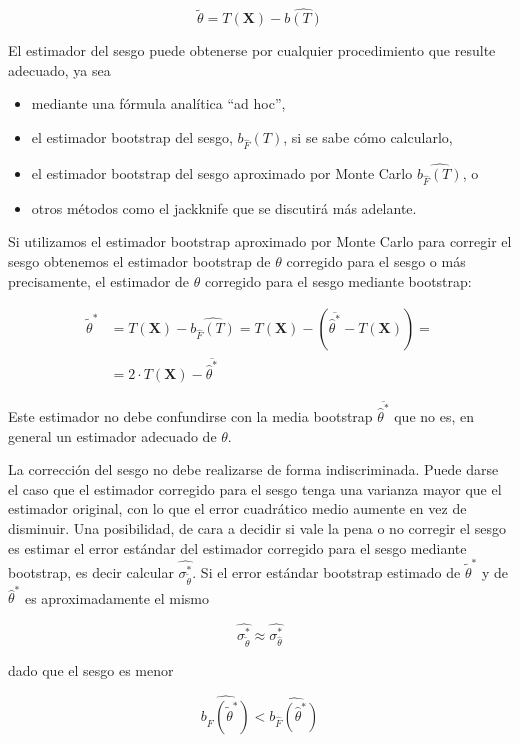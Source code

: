 \documentclass[
]{article}
\providecommand{\tightlist}{%
  \setlength{\itemsep}{0pt}\setlength{\parskip}{0pt}}
\begin{document}
\[
\tilde{\theta}=T(\mathbf{X})-\widehat{b(T)}
\]

El estimador del sesgo puede obtenerse por cualquier procedimiento que resulte adecuado, ya sea

\begin{itemize}
\tightlist
\item
  mediante una fórmula analítica ``ad hoc'',
\item
  el estimador bootstrap del sesgo, \(b_{\hat{F}}(T)\), si se sabe cómo calcularlo,
\item
  el estimador bootstrap del sesgo aproximado por Monte Carlo \(\widehat{b_{\hat{F}}(T)}\), o
\item
  otros métodos como el jackknife que se discutirá más adelante.
\end{itemize}

Si utilizamos el estimador bootstrap aproximado por Monte Carlo para corregir el sesgo obtenemos el estimador bootstrap de \(\theta\) corregido para el sesgo o más precisamente, el estimador de \(\theta\) corregido para el sesgo mediante bootstrap:

\[
\begin{aligned}
\tilde{\theta}^{*} & =T(\mathbf{X})-\widehat{b_{\hat{F}}(T)}=T(\mathbf{X})-\left(\overline{\hat{\theta}^{*}}-T(\mathbf{X})\right)= \\
& =2 \cdot T(\mathbf{X})-\overline{\hat{\theta}^{*}}
\end{aligned}
\]

Este estimador no debe confundirse con la media bootstrap \(\overline{\hat{\theta}^{*}}\) que no es, en general un estimador adecuado de \(\theta\).

La corrección del sesgo no debe realizarse de forma indiscriminada. Puede darse el caso que el estimador corregido para el sesgo tenga una varianza mayor que el estimador original, con lo que el error cuadrático medio aumente en vez de disminuir. Una posibilidad, de cara a decidir si vale la pena o no corregir el sesgo es estimar el error estándar del estimador corregido para el sesgo mediante bootstrap, es decir calcular \(\widehat{\sigma_{\tilde{\theta}}^{*}}\). Si el error estándar bootstrap estimado de \(\tilde{\theta}^{*}\) y de \(\hat{\theta}^{*}\) es aproximadamente el mismo

\[
\widehat{\sigma_{\tilde{\theta}}^{*}} \approx \widehat{\sigma_{\hat{\theta}}^{*}}
\]

dado que el sesgo es menor

\[
\widehat{b_{\hat{F}}\left(\tilde{\theta}^{*}\right)}<\widehat{b_{\hat{F}}\left(\hat{\theta}^{*}\right)}
\]
\end{document}
